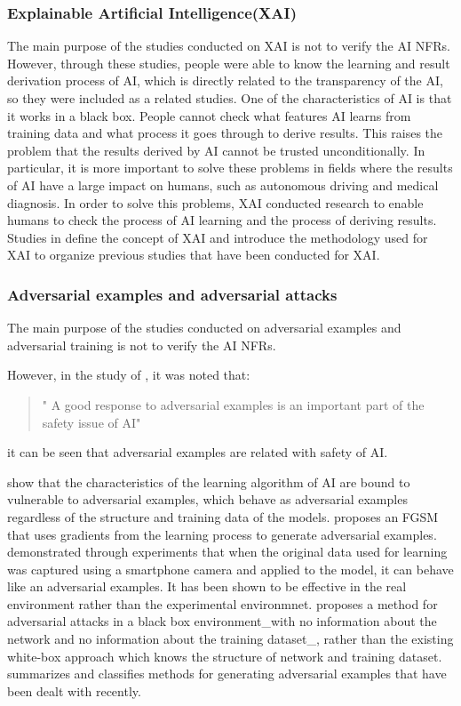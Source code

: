 \documentclass[journal,article,submit,moreauthors,pdftex]{Definitions/mdpi}
\begin{document}
\subsubsection{Explainable Artificial Intelligence(XAI)}

The main purpose of the studies conducted on XAI is not to verify the AI NFRs.
However, through these studies, people were able to know the learning and result derivation process of AI, which is directly related to the transparency of the AI, so they were included as a related studies.
One of the characteristics of AI is that it works in a black box. People cannot check what features AI learns from training data and what process it goes through to derive results.
This raises the problem that the results derived by AI cannot be trusted unconditionally.
In particular, it is more important to solve these problems in fields where the results of AI have a large impact on humans, such as autonomous driving and medical diagnosis.
In order to solve this problems, XAI conducted research to enable humans to check the process of AI learning and the process of deriving results.
Studies in \cite{xai-samek, xai-arrieta,ai-medical-xai-holzinger,xai-transparency-ribeiro,xai-transparency-murdoch} define the concept of XAI and introduce the methodology used for XAI to organize previous studies that have been conducted for XAI.

\subsubsection{Adversarial examples and adversarial attacks}

The main purpose of the studies conducted on adversarial examples and adversarial training is not to verify the AI NFRs.

However, in the study of \cite{adversarial-kurakin}, it was noted that:
\begin{quote}
   " A good response to adversarial examples is an important part of the safety issue of AI"
\end{quote}
it can be seen that adversarial examples are related with safety of AI.

\cite{adversarial-szegedy,adversarial-goodfellow} show that the characteristics of the learning algorithm of AI are bound to vulnerable to adversarial examples, which behave as adversarial examples regardless of the structure and training data of the models.
\cite{adversarial-goodfellow} proposes an FGSM that uses gradients from the learning process to generate adversarial examples.
\cite{adversarial-kurakin2} demonstrated through experiments that when the original data used for learning was captured using a smartphone camera and applied to the model, it can behave like an adversarial examples. It has been shown to be effective in the real environment rather than the experimental environmnet.
\cite{adversarial-papernot} proposes a method for adversarial attacks in a black box environment\_with no information about the network and no information about the training dataset\_, rather than the existing white-box approach which knows the structure of network and training dataset.
\cite{adversarial-yuan} summarizes and classifies methods for generating adversarial examples that have been dealt with recently.
\end{document}
